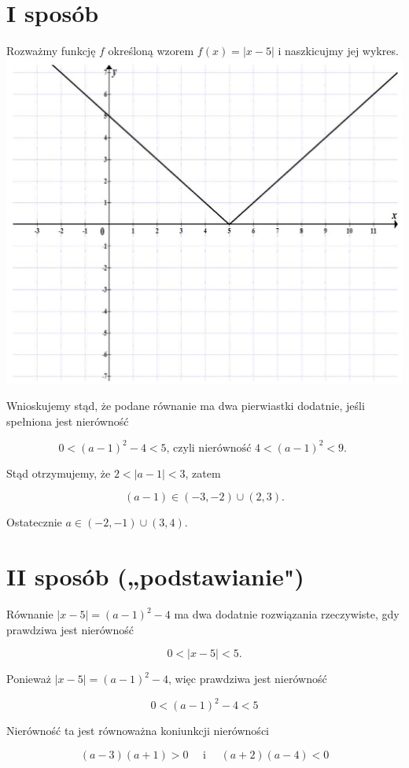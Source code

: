 \documentclass[10pt]{article}
\begin{document}
\section*{I sposób}
Rozważmy funkcję $f$ określoną wzorem $f(x)=|x-5|$ i naszkicujmy jej wykres.\\
\includegraphics[max width=\textwidth, center]{2025_02_07_176452ab2cb6278af830g-07}

Wnioskujemy stąd, że podane równanie ma dwa pierwiastki dodatnie, jeśli spełniona jest nierówność

$$
0<(a-1)^{2}-4<5 \text {, czyli nierówność } 4<(a-1)^{2}<9 \text {. }
$$

Stąd otrzymujemy, że $2<|a-1|<3$, zatem

$$
(a-1) \in(-3,-2) \cup(2,3) .
$$

Ostatecznie $a \in(-2,-1) \cup(3,4)$.

\section*{II sposób („podstawianie")}
Równanie $|x-5|=(a-1)^{2}-4$ ma dwa dodatnie rozwiązania rzeczywiste, gdy prawdziwa jest nierówność

$$
0<|x-5|<5 .
$$

Ponieważ $|x-5|=(a-1)^{2}-4$, więc prawdziwa jest nierówność

$$
0<(a-1)^{2}-4<5
$$

Nierówność ta jest równoważna koniunkcji nierówności

$$
(a-3)(a+1)>0 \quad \text { i } \quad(a+2)(a-4)<0
$$
\end{document}
